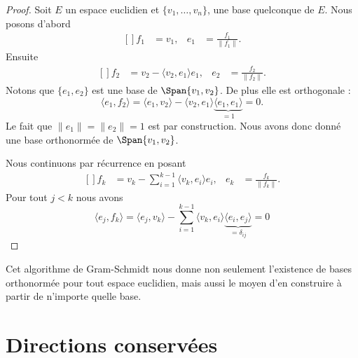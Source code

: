 \begin{proof}
    Soit \( E\) un espace euclidien et \( \{ v_1,\ldots, v_n \}\), une base quelconque de \( E\). Nous posons d'abord
    \begin{equation}
        \begin{aligned}[]
            f_1&=v_1,&e_1&=\frac{ f_1 }{ \| f_1 \| }.
        \end{aligned}
    \end{equation}
    Ensuite
    \begin{equation}
        \begin{aligned}[]
            f_2&=v_2-\langle v_2, e_1\rangle e_1,&e_2&=\frac{ f_2 }{ \| f_2 \| }.
        \end{aligned}
    \end{equation}
    Notons que \( \{ e_1,e_2 \}\) est une base de \( \Span\{ v_1,v_2 \}\). De plus elle est orthogonale :
    \begin{equation}
        \langle e_1, f_2\rangle =\langle e_1, v_2\rangle -\langle v_2, e_1\rangle \underbrace{\langle e_1, e_1\rangle}_{=1} =0.
    \end{equation}
    Le fait que \( \| e_1 \|=\| e_2 \|=1\) est par construction. Nous avons donc donné une base orthonormée de \( \Span\{ v_1,v_2 \}\).

    Nous continuons par récurrence en posant
    \begin{equation}
        \begin{aligned}[]
            f_k&=v_k-\sum_{i=1}^{k-1}\langle v_k, e_i\rangle e_i,&e_k&=\frac{ f_k }{ \| f_k \| }.
        \end{aligned}
    \end{equation}
    Pour tout \( j<k\) nous avons
    \begin{equation}
        \langle e_j, f_k\rangle =\langle e_j, v_k\rangle -\sum_{i=1}^{k-1}\langle v_k, e_i\rangle \underbrace{\langle e_i, e_j\rangle}_{=\delta_{ij}} =0
    \end{equation}
\end{proof}
Cet algorithme de Gram-Schmidt nous donne non seulement l'existence de bases orthonormée pour tout espace euclidien, mais aussi le moyen d'en construire à partir de n'importe quelle base.



\section{Directions conservées}

